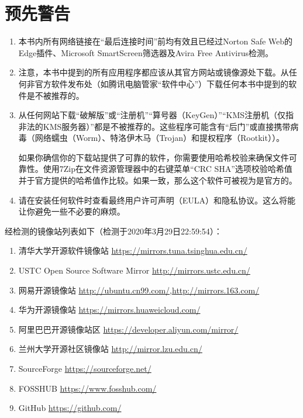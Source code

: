 \chapter*{预先警告}
\begin{enumerate}
\item 本书内所有网络链接在“最后连接时间”前均有效且已经过Norton Safe Web的Edge插件、Microsoft SmartScreen筛选器及Avira Free Antivirus检测。 
\item 注意，本书中提到的所有应用程序都应该从其官方网站或镜像源处下载。从任何非官方软件发布处（如腾讯电脑管家“软件中心”）下载任何本书中提到的软件是不被推荐的。\par 
\item 从任何网站下载“破解版”或“注册机”“算号器（KeyGen）”“KMS注册机（仅指非法的KMS服务器）”都是不被推荐的。这些程序可能含有“后门”或直接携带病毒（网络蠕虫（Worm）、特洛伊木马（Trojan）和提权程序（Rootkit）\cite{HR1,HR2,HR3,HR4,HR5}）。\par
如果你确信你的下载站提供了可靠的软件，你需要使用哈希校验来确保文件可靠性。使用7Zip在文件资源管理器中的右键菜单“CRC SHA”选项校验哈希值并于官方提供的哈希值作比较。如果一致，那么这个软件可被视为是官方的。
\item 请在安装任何软件时查看最终用户许可声明（EULA）和隐私协议。这么将能让你避免一些不必要的麻烦。
\end{enumerate}
经检测的镜像站列表如下（检测于2020年3月29日22:59:54）：
\begin{enumerate}
	\item 清华大学开源软件镜像站 \url{https://mirrors.tuna.tsinghua.edu.cn/}
	\item USTC Open Source Software Mirror \url{http://mirrors.ustc.edu.cn/}
	\item 网易开源镜像站 \url{http://ubuntu.cn99.com/},\url{http://mirrors.163.com/}
	\item 华为开源镜像站 \url{https://mirrors.huaweicloud.com/}
	\item 阿里巴巴开源镜像站区 \url{https://developer.aliyun.com/mirror/}
	\item 兰州大学开源社区镜像站 \url{http://mirror.lzu.edu.cn/}
	\item SourceForge \url{https://sourceforge.net/}
	\item FOSSHUB \url{https://www.fosshub.com/}
	\item GitHub \url{https://github.com/}
\end{enumerate}
